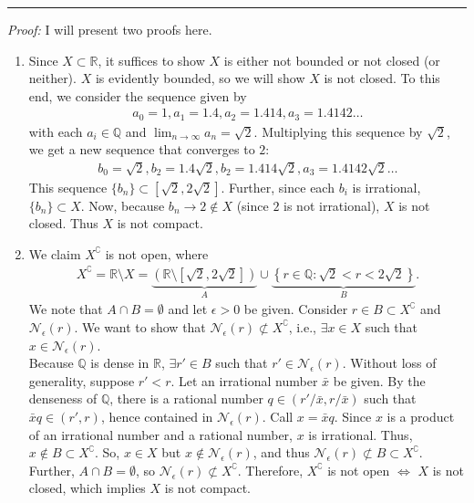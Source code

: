 \documentclass[11pt]{article}
\begin{document}
\hrule
$\,$\\
\noindent \textit{Proof:} I will present two proofs here. 
\begin{enumerate}
	\item Since $X \subset \mathbb{R}$, it suffices to show $X$ is either not bounded or not closed (or neither). $X$ is evidently bounded, so we will show $X$ is not closed. To this end, we consider the sequence given by
	\begin{align*}
	a_0 = 1, a_1 = 1.4, a_2 = 1.414, a_3 = 1.4142 \dots
	\end{align*}
	with each $a_i \in \mathbb{Q}$ and $\lim_{n\to \infty}a_n = \sqrt{2}$. Multiplying this sequence by $\sqrt{2}$, we get a new sequence that converges to $2$:
	\begin{align*}
	b_0 = \sqrt{2}, b_2 = 1.4\sqrt{2}, b_2 = 1.414\sqrt{2}, a_3 = 1.4142\sqrt{2} \dots
	\end{align*} 
	This sequence $\{ b_n\} \subset [\sqrt{2}, 2\sqrt{2}]$. Further, since each $b_i$ is irrational, $\{b_n\}\subset X$. Now, because $b_n \to 2 \notin X$ (since $2$ is not irrational), $X$ is not closed. Thus $X$ is not compact.
	
	
	
	\item We claim $X^\complement$ is not open, where
	\begin{align*}
	X^\complement = \mathbb{R}\setminus X= \underbrace{\left(\mathbb{R}\setminus [\sqrt{2}, 2\sqrt{2}]\right)}_{A}\cup \underbrace{\left\{ r\in \mathbb{Q} : \sqrt{2} < r < 2\sqrt{2} \right\}}_{B}.
	\end{align*}
	We note that $A \cap B = \emptyset$ and let $\epsilon > 0$ be given. Consider $r\in B \subset X^\complement$ and $\mathcal{N}_\epsilon(r)$. We want to show that $\mathcal{N}_\epsilon(r) \not\subset X^\complement$, i.e., $\exists x \in X$ such that $x \in \mathcal{N}_\epsilon(r)$.\\
	
	
	Because $\mathbb{Q}$ is dense in $\mathbb{R}$, $\exists r' \in B$ such that $ r'\in \mathcal{N}_\epsilon(r)$. Without loss of generality, suppose $r' < r$. Let an irrational number $\bar{x}$ be given. By the denseness of $\mathbb{Q}$, there is a rational number $q\in (r'/\bar{x},r/\bar{x})$ such that $\bar{x}q \in (r',r)$, hence contained in $\mathcal{N}_\epsilon(r)$. Call $x = \bar{x}q$. Since $x$ is a product of an irrational number and a rational number, $x$ is irrational. Thus, $x\notin B \subset X^\complement$. So, $x\in X$ but $x\notin \mathcal{N}_\epsilon(r)$, and thus $\mathcal{N}_\epsilon(r) \not\subset B \subset X^\complement$. Further, $A \cap B = \emptyset$, so $\mathcal{N}_\epsilon(r) \not\subset X^\complement$. Therefore, $X^\complement$ is not open $\iff$ $X$ is not closed, which implies $X$ is not compact. \\
\end{enumerate}
\end{document}
